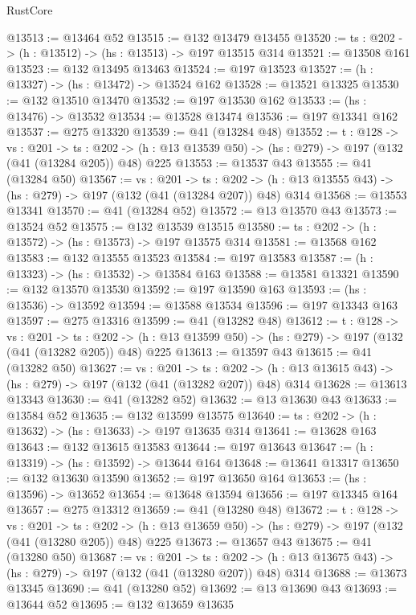 \begin{lexlean}{RustCore}
\begin{coremodule}
@13513 := @13464 @52
@13515 := @132 @13479 @13455
@13520 := {ts : @202} -> (h : @13512) -> (hs : @13513) -> @197 @13515 @314
@13521 := @13508 @161
@13523 := @132 @13495 @13463
@13524 := @197 @13523
@13527 := (h : @13327) -> (hs : @13472) -> @13524 @162
@13528 := @13521 @13325
@13530 := @132 @13510 @13470
@13532 := @197 @13530 @162
@13533 := (hs : @13476) -> @13532
@13534 := @13528 @13474
@13536 := @197 @13341 @162
@13537 := @275 @13320
@13539 := @41 (@13284 @48)
@13552 := {t : @128} ->
  {vs : @201} ->
  {ts : @202} -> (h : @13 @13539 @50) -> (hs : @279) -> @197 (@132 (@41 (@13284 @205)) @48) @225
@13553 := @13537 @43
@13555 := @41 (@13284 @50)
@13567 := {vs : @201} ->
  {ts : @202} -> (h : @13 @13555 @43) -> (hs : @279) -> @197 (@132 (@41 (@13284 @207)) @48) @314
@13568 := @13553 @13341
@13570 := @41 (@13284 @52)
@13572 := @13 @13570 @43
@13573 := @13524 @52
@13575 := @132 @13539 @13515
@13580 := {ts : @202} -> (h : @13572) -> (hs : @13573) -> @197 @13575 @314
@13581 := @13568 @162
@13583 := @132 @13555 @13523
@13584 := @197 @13583
@13587 := (h : @13323) -> (hs : @13532) -> @13584 @163
@13588 := @13581 @13321
@13590 := @132 @13570 @13530
@13592 := @197 @13590 @163
@13593 := (hs : @13536) -> @13592
@13594 := @13588 @13534
@13596 := @197 @13343 @163
@13597 := @275 @13316
@13599 := @41 (@13282 @48)
@13612 := {t : @128} ->
  {vs : @201} ->
  {ts : @202} -> (h : @13 @13599 @50) -> (hs : @279) -> @197 (@132 (@41 (@13282 @205)) @48) @225
@13613 := @13597 @43
@13615 := @41 (@13282 @50)
@13627 := {vs : @201} ->
  {ts : @202} -> (h : @13 @13615 @43) -> (hs : @279) -> @197 (@132 (@41 (@13282 @207)) @48) @314
@13628 := @13613 @13343
@13630 := @41 (@13282 @52)
@13632 := @13 @13630 @43
@13633 := @13584 @52
@13635 := @132 @13599 @13575
@13640 := {ts : @202} -> (h : @13632) -> (hs : @13633) -> @197 @13635 @314
@13641 := @13628 @163
@13643 := @132 @13615 @13583
@13644 := @197 @13643
@13647 := (h : @13319) -> (hs : @13592) -> @13644 @164
@13648 := @13641 @13317
@13650 := @132 @13630 @13590
@13652 := @197 @13650 @164
@13653 := (hs : @13596) -> @13652
@13654 := @13648 @13594
@13656 := @197 @13345 @164
@13657 := @275 @13312
@13659 := @41 (@13280 @48)
@13672 := {t : @128} ->
  {vs : @201} ->
  {ts : @202} -> (h : @13 @13659 @50) -> (hs : @279) -> @197 (@132 (@41 (@13280 @205)) @48) @225
@13673 := @13657 @43
@13675 := @41 (@13280 @50)
@13687 := {vs : @201} ->
  {ts : @202} -> (h : @13 @13675 @43) -> (hs : @279) -> @197 (@132 (@41 (@13280 @207)) @48) @314
@13688 := @13673 @13345
@13690 := @41 (@13280 @52)
@13692 := @13 @13690 @43
@13693 := @13644 @52
@13695 := @132 @13659 @13635

\end{coremodule}
\end{lexlean}
